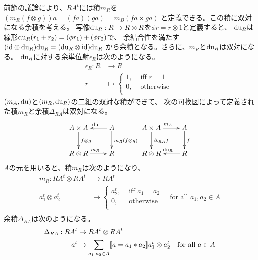 	前節の議論により、$RA^t$には積$m_R$を$(m_R(f\otimes g))a=(fa)(ga)=m_B(fa\times ga)$
	と定義できる。この積に双対になる余積を考える。
	写像${\operatorname{du}}_R:R\to R\otimes R$を$\phi r=r\otimes 1$と定義すると、
	${\operatorname{du}}_R$は線形${\operatorname{du}}_R(r_1+r_2)=(\phi r_1)+(\phi r_2)$で、
	余結合性を満たす$({\operatorname{id}}\otimes {\operatorname{du}}_R){\operatorname{du}}_R=({\operatorname{du}}_R\otimes {\operatorname{id}}){\operatorname{du}}_R$
	から余積となる。さらに、$m_R$と${\operatorname{du}}_R$は双対になる。
	${\operatorname{du}}_R$に対する余単位射$\epsilon_R$は次のようになる。
	\begin{equation}\begin{split} %
		\epsilon_R: R &\to R \\
		r &\mapsto \begin{cases} %
			1, &\text{ iff } r = 1 \\
			0, &\text{ otherwise } \\
		\end{cases} %
	\end{split}\end{equation} %
	$(m_A,{\operatorname{du}})$と$(m_R,{\operatorname{du}}_R)$の二組の双対な積ができて、
	次の可換図によって定義された積$m_R$と余積$\Delta_{RA}$は双対になる。
	\begin{equation}\label{eq:乗法の畳み込みによる積と余積}\xymatrix{
		A\times A \ar[d]^{f\otimes g} & A \ar[l]_{\mydu} \ar[d]^{m_R(f\otimes g)} \\
		R\otimes R \ar[r]^{m_R} & R \\
	}\xymatrix{
		A\times A \ar[d]^{\Delta_{RA} f} \ar[r]^{m_A} & A \ar[d]^{f} \\
		R\otimes R & R \ar[l]_{\mydu_R} \\
	}\end{equation}
	$A$の元を用いると、積$m_R$は次のようになり、
	\begin{equation}\begin{split} %
		m_R: RA^t\otimes RA^t &\to RA^t \\
			a_1^t \otimes a_2^t &\mapsto \begin{cases} %
				a_2^t, &\text{ iff } a_1 = a_2 \\
				0, &\text{ otherwise } \\
			\end{cases} %
			\quad\text{for all }a_1,a_2\in A \\
	\end{split}\end{equation} %
	余積$\Delta_{RA}$は次のようになる。
	\begin{equation}\begin{split} %
		\Delta_{RA}: RA^t &\to RA^t\otimes RA^t \\
			a^t &\mapsto \sum_{a_1,a_2\in A}\jump{a=a_1*a_2}a_1^t\otimes a_2^t
			\quad\text{for all }a\in A \\
	\end{split}\end{equation} %
